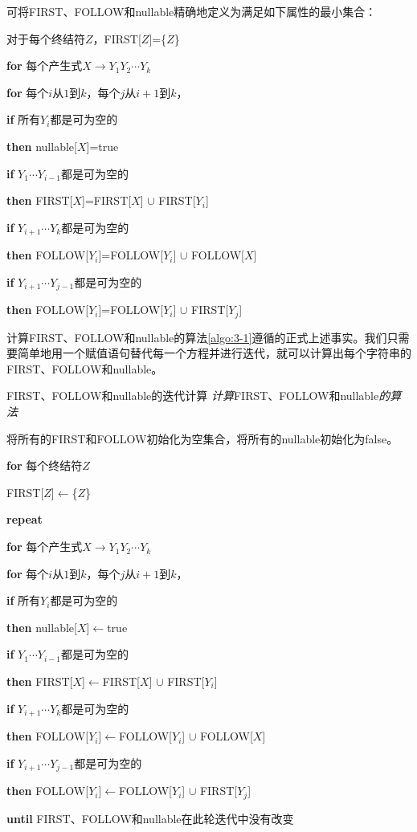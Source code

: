 \documentclass[cn,11pt,chinese]{elegantbook}
\begin{document}
可将FIRST、FOLLOW和nullable精确地定义为满足如下属性的最小集合：

\begin{tcolorbox}
对于每个终结符$Z$，FIRST[$Z$]=\{$Z$\}

\textbf{for} 每个产生式$X \rightarrow Y_1Y_2\cdots Y_k$

\;\;\;\textbf{for} 每个$i$从$1$到$k$，每个$j$从$i+1$到$k$，

\;\;\;\;\;\;\textbf{if} 所有$Y_i$都是可为空的

\;\;\;\;\;\;\;\;\;\;\textbf{then} nullable[$X$]=true

\;\;\;\;\;\;\textbf{if} $Y_1\cdots Y_{i-1}$都是可为空的

\;\;\;\;\;\;\;\;\;\;\textbf{then} FIRST[$X$]=FIRST[$X$] $\cup$ FIRST[$Y_i$]

\;\;\;\;\;\;\textbf{if} $Y_{i+1}\cdots Y_{k}$都是可为空的

\;\;\;\;\;\;\;\;\;\;\textbf{then} FOLLOW[$Y_i$]=FOLLOW[$Y_i$] $\cup$ FOLLOW[$X$]

\;\;\;\;\;\;\textbf{if} $Y_{i+1}\cdots Y_{j-1}$都是可为空的

\;\;\;\;\;\;\;\;\;\;\textbf{then} FOLLOW[$Y_i$]=FOLLOW[$Y_i$] $\cup$ FIRST[$Y_j$]
\end{tcolorbox}

计算FIRST、FOLLOW和nullable的算法\ref{algo:3-1}遵循的正式上述事实。我们只需要简单地用一个赋值语句替代每一个方程并进行迭代，就可以计算出每个字符串的FIRST、FOLLOW和nullable。

\begin{MyBox}[label=algo:3-1]{FIRST、FOLLOW和nullable的迭代计算}
\textit{计算}FIRST、FOLLOW和nullable\textit{的算法}

将所有的FIRST和FOLLOW初始化为空集合，将所有的nullable初始化为false。

\textbf{for} 每个终结符$Z$

\;\;\;\;\;\; FIRST[$Z$]$\leftarrow$\{$Z$\}

\textbf{repeat}

\;\;\;\textbf{for} 每个产生式$X \rightarrow Y_1Y_2\cdots Y_k$

\;\;\;\;\;\;\textbf{for} 每个$i$从$1$到$k$，每个$j$从$i+1$到$k$，

\;\;\;\;\;\;\;\;\;\textbf{if} 所有$Y_i$都是可为空的

\;\;\;\;\;\;\;\;\;\;\;\;\;\textbf{then} nullable[$X$]$\leftarrow$true

\;\;\;\;\;\;\;\;\;\textbf{if} $Y_1\cdots Y_{i-1}$都是可为空的

\;\;\;\;\;\;\;\;\;\;\;\;\;\textbf{then} FIRST[$X$]$\leftarrow$FIRST[$X$] $\cup$ FIRST[$Y_i$]

\;\;\;\;\;\;\;\;\;\textbf{if} $Y_{i+1}\cdots Y_{k}$都是可为空的

\;\;\;\;\;\;\;\;\;\;\;\;\;\textbf{then} FOLLOW[$Y_i$]$\leftarrow$FOLLOW[$Y_i$] $\cup$ FOLLOW[$X$]

\;\;\;\;\;\;\;\;\;\textbf{if} $Y_{i+1}\cdots Y_{j-1}$都是可为空的

\;\;\;\;\;\;\;\;\;\;\;\;\;\textbf{then} FOLLOW[$Y_i$]$\leftarrow$FOLLOW[$Y_i$] $\cup$ FIRST[$Y_j$]

\textbf{until} FIRST、FOLLOW和nullable在此轮迭代中没有改变
\end{MyBox}
\end{document}
